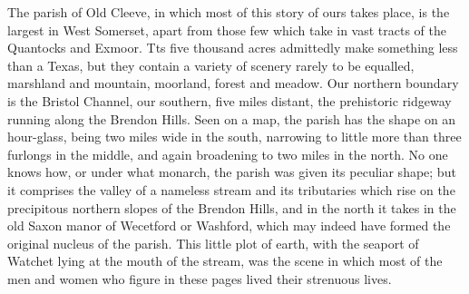 
The parish of Old Cleeve, in which most of this story of ours takes place, is the largest in West Somerset, apart from those few which take in vast tracts of the Quantocks and Exmoor. Tts five thousand acres admittedly make something less than a Texas, but they contain a variety of scenery rarely to be equalled, marshland and mountain, moorland, forest and meadow. Our northern boundary is the Bristol Channel, our southern, five miles distant, the prehistoric ridgeway running along the Brendon Hills. Seen on a map, the parish has the shape on an hour-glass, being two miles wide in the south, narrowing to little more than three furlongs in the middle, and again broadening to two miles in the north. No one knows how, or under what monarch, the parish was given its peculiar shape; but it comprises the valley of a nameless stream and its tributaries which rise on the precipitous northern slopes of the Brendon Hills, and in the north it takes in the old Saxon manor of Wecetford or Washford, which may indeed have formed the original nucleus of the parish. This little plot of earth, with the seaport of Watchet lying at the mouth of the stream, was the scene in which most of the men and women who figure in these pages lived their strenuous lives.


